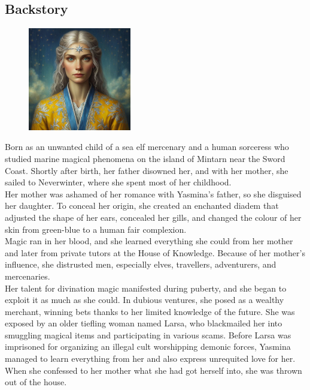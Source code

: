 \documentclass[10pt,onecolumn,twoside,openany,bg=full,layout=true]{dndbook}
\begin{document}
\subsection{Backstory}\label{subsec:yasmina-backstory}
\begin{figure}
  \begin{center}
    \includegraphics[width=0.4\textwidth]{img/yasmina}
    \vspace{1cm}
  \end{center}
\end{figure}
Born as an unwanted child of a sea elf mercenary and a human sorceress who studied marine magical phenomena on the
island of Mintarn near the Sword Coast.
Shortly after birth, her father disowned her, and with her mother, she sailed
to Neverwinter, where she spent most of her childhood.\\
Her mother was ashamed of her romance with Yasmina's father, so she disguised her daughter.
To conceal her origin, she created an enchanted diadem that adjusted the shape of her ears, concealed her gills,
and changed the colour of her skin from green-blue to a human fair complexion.\\
Magic ran in her blood, and she learned everything she could from her mother and later from private tutors at the
House of Knowledge.
Because of her mother's influence, she distrusted men, especially elves, travellers, adventurers, and mercenaries.\\
Her talent for divination magic manifested during puberty, and she began to exploit it as much as she could.
In dubious ventures, she posed as a wealthy merchant, winning bets thanks to her limited knowledge of the future.
She was exposed by an older tiefling woman named Larsa, who blackmailed her into smuggling magical items and
participating in various scams.
Before Larsa was imprisoned for organizing an illegal cult worshipping demonic forces, Yasmina managed to learn
everything from her and also express unrequited love for her.
When she confessed to her mother what she had got herself into, she was thrown out of the house.\\
\end{document}
